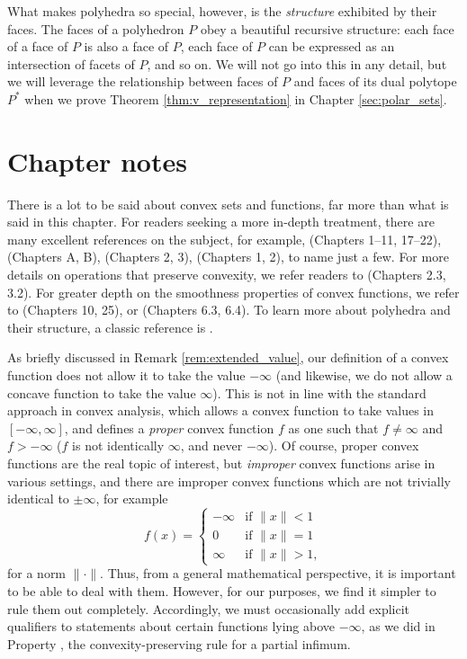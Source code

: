 What makes polyhedra so special, however, is the \emph{structure} exhibited by
their faces. The faces of a polyhedron $P$ obey a beautiful recursive 
structure: each face of a face of $P$ is also a face of $P$, each face of $P$
can be expressed as an intersection of facets of $P$, and so on. 
We will not go into this in any detail, but we will leverage the relationship
between faces of $P$ and faces of its dual polytope $P^*$ when we prove
Theorem \ref{thm:v_representation} in Chapter \ref{sec:polar_sets}. 

\SkipTocEntry\section*{Chapter notes}

There is a lot to be said about convex sets and functions, far more than what is
said in this chapter. For readers seeking a more in-depth treatment, there are
many excellent references on the subject, for example,
\cite{rockafellar1970convex} (Chapters 1--11, 17--22),
\cite{hiriartUrruty2001fundamentals} (Chapters A, B), \cite{boyd2004convex}
(Chapters 2, 3), \cite{bertsekas2009convex} (Chapters 1, 2), to name just a
few. For more details on operations that preserve convexity, we refer readers to 
\cite{boyd2004convex} (Chapters 2.3, 3.2). For greater depth on the smoothness
properties of convex functions, we refer to \cite{rockafellar1970convex}
(Chapters 10, 25), or \cite{evans2015measure} (Chapters 6.3, 6.4). To learn more
about polyhedra and their structure, a classic reference is
\cite{grunbaum2003convex}.  

As briefly discussed in Remark \ref{rem:extended_value}, our definition of a
convex function does not allow it to take the value $-\infty$ (and likewise, we
do not allow a concave function to take the value $\infty$). This is not in line
with the standard approach in convex analysis, which allows a convex
function to take values in $[-\infty,\infty]$, and defines a \emph{proper} 
convex function $f$ as one such that $f \not= \infty$ and $f > -\infty$ ($f$ is
not identically $\infty$, and never $-\infty$). Of course, proper convex
functions are the real topic of interest, but \emph{improper} convex functions
arise in various settings, and there are improper convex functions which are 
not trivially identical to $\pm \infty$, for example  
\[
f(x) = \begin{cases}
-\infty & \text{if $\|x\| < 1$} \\
0 & \text{if $\|x\| = 1$} \\
\infty & \text{if $\|x\| > 1$},
\end{cases}
\]
for a norm $\|\cdot\|$. Thus, from a general mathematical perspective, it is
important to be able to deal with them. However, for our purposes, we find it
simpler to rule them out completely. Accordingly, we must occasionally add
explicit qualifiers to statements about certain functions lying above $-\infty$,  
as we did in Property , the convexity-preserving
rule for a partial infimum.

